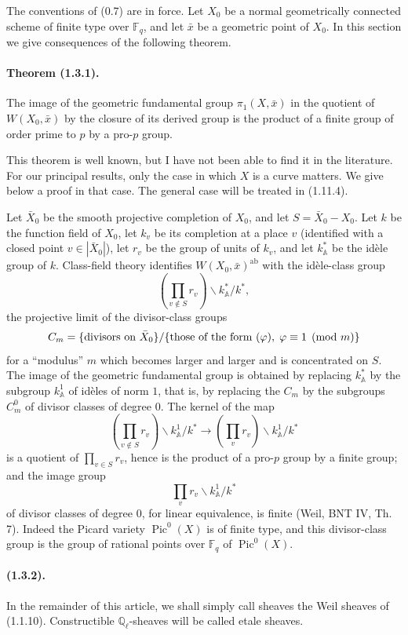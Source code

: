 \documentclass[11pt]{article}
\theoremstyle{remark}
\newcommand{\Ql}{\mathbb{Q}_\ell}
\newcommand{\Fq}{\mathbb{F}_q}
\newcommand{\Pic}{\operatorname{Pic}}
\begin{document}
The conventions of (0.7) are in force. Let $X_0$ be a normal geometrically connected scheme of finite type over $\Fq$, and let $\bar x$ be a geometric point of $X_0$. In this section we give consequences of the following theorem.

\paragraph{Theorem (1.3.1).} The image of the geometric fundamental group $\pi_1(X,\bar x)$ in the quotient of $W(X_0,\bar x)$ by the closure of its derived group is the product of a finite group of order prime to $p$ by a pro-$p$ group.

This theorem is well known, but I have not been able to find it in the literature. For our principal results, only the case in which $X$ is a curve matters. We give below a proof in that case. The general case will be treated in (1.11.4).

Let $\bar X_0$ be the smooth projective completion of $X_0$, and let $S=\bar X_0-X_0$. Let $k$ be the function field of $X_0$, let $k_v$ be its completion at a place $v$ (identified with a closed point $v\in |\bar X_0|$), let $r_v$ be the group of units of $k_v$, and let $k_{\mathbb A}^*$ be the idèle group of $k$. Class-field theory identifies $W(X_0,\bar x)^{\mathrm{ab}}$ with the idèle-class group
\[
\left(\prod_{v\notin S} r_v\right)\backslash k_{\mathbb A}^*/k^*,
\]
the projective limit of the divisor-class groups
\[
 C_m=\{\hbox{divisors on }\bar X_0\}/\{\hbox{those of the form }(\varphi),\;\varphi\equiv 1\pmod m\}
\]
for a ``modulus'' $m$ which becomes larger and larger and is concentrated on $S$. The image of the geometric fundamental group is obtained by replacing $k_{\mathbb A}^*$ by the subgroup $k_{\mathbb A}^{1}$ of idèles of norm $1$, that is, by replacing the $C_m$ by the subgroups $C_m^0$ of divisor classes of degree $0$. The kernel of the map
\[
\left(\prod_{v\notin S}r_v\right)\backslash k_{\mathbb A}^{1}/k^*
\longrightarrow
\left(\prod_v r_v\right)\backslash k_{\mathbb A}^{1}/k^*
\]
is a quotient of $\prod_{v\in S} r_v$, hence is the product of a pro-$p$ group by a finite group; and the image group
\[
\prod_v r_v\backslash k_{\mathbb A}^{1}/k^*
\]
of divisor classes of degree $0$, for linear equivalence, is finite (Weil, BNT IV, Th. 7). Indeed the Picard variety $\Pic^0(X)$ is of finite type, and this divisor-class group is the group of rational points over $\Fq$ of $\Pic^0(X)$.

\paragraph{(1.3.2).} In the remainder of this article, we shall simply call sheaves the Weil sheaves of (1.1.10). Constructible $\Ql$-sheaves will be called etale sheaves.
\end{document}
